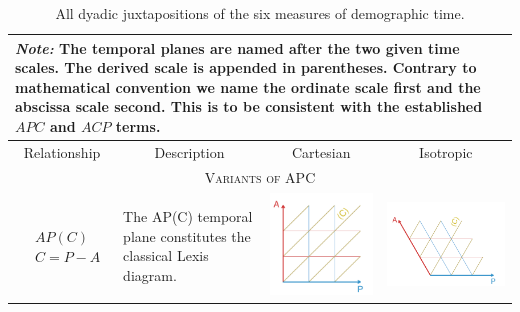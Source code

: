 \documentclass[12pt,oneside,a4paper]{article} %
\begin{document}
\begin{longtable}{m{}m{}m{}m{}}
  \caption{All dyadic juxtapositions of the six measures of demographic time.}
  \label{tab:dyads}\\
 
  \toprule
  \multicolumn{4}{m{0.9\textwidth}}{\footnotesize \emph{Note:} The temporal planes are named after the two given time scales. The derived scale is appended in parentheses. Contrary to mathematical convention we name the ordinate scale first and the abscissa scale second. This is to be consistent with the established $APC$ and $ACP$ terms.} \\
  \midrule
  \multicolumn{1}{c}{Relationship} & \multicolumn{1}{c}{Description} &
  \multicolumn{1}{c}{Cartesian} & \multicolumn{1}{c}{Isotropic} \\
  \midrule
  \multicolumn{4}{c}{\textsc{Variants of APC}} \\
  \midrule
  $$\begin{aligned}
    &AP(C) \\
    &C = P - A
  \end{aligned}$$ &
  The AP(C) temporal plane constitutes the classical Lexis diagram. &
  \includegraphics[scale=.5]{Figures/DiagramTable/AP_rt.pdf}
  &
  \includegraphics[scale=.5]{Figures/DiagramTable/AP_iso.pdf}

\end{longtable}
\end{document}
